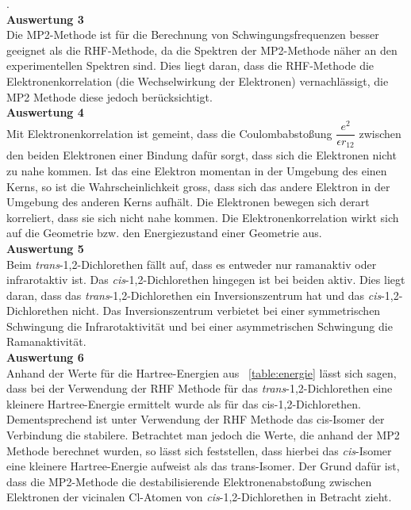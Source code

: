 \documentclass[12pt]{article}
\begin{document}
\begin{onehalfspace}
.\\
\textbf{Auswertung 3}\\
Die MP2-Methode ist für die Berechnung von Schwingungsfrequenzen besser geeignet als die RHF-Methode,
da die Spektren der MP2-Methode näher an den experimentellen Spektren sind.
Dies liegt daran, dass die RHF-Methode die Elektronenkorrelation (die Wechselwirkung der Elektronen) vernachlässigt,
die MP2 Methode diese jedoch berücksichtigt.\\
\textbf{Auswertung 4}\\
Mit Elektronenkorrelation ist gemeint, dass die Coulombabstoßung $\dfrac{e^2}{\epsilon r_{12}}$ zwischen den beiden Elektronen einer Bindung dafür sorgt, dass sich
die Elektronen nicht zu nahe kommen. Ist das eine Elektron momentan in der Umgebung des einen Kerns,
so ist die Wahrscheinlichkeit gross, dass sich das andere Elektron in der Umgebung des anderen Kerns aufhält. Die Elektronen bewegen sich derart \glqq
korreliert\grqq, dass sie sich nicht nahe kommen. Die Elektronenkorrelation wirkt sich auf die Geometrie bzw. den
Energiezustand einer Geometrie aus.\cite{coulson}  \\
\textbf{Auswertung 5}\\
Beim \textit{trans}-1,2-Dichlorethen fällt auf, dass es entweder nur ramanaktiv oder infrarotaktiv ist.
Das \textit{cis}-1,2-Dichlorethen hingegen
 ist bei beiden aktiv. Dies liegt daran, dass das \textit{trans}-1,2-Dichlorethen ein
  Inversionszentrum hat und das \textit{cis}-1,2-Dichlorethen nicht.
Das Inversionszentrum verbietet bei einer symmetrischen Schwingung die
Infrarotaktivität und bei einer asymmetrischen Schwingung die Ramanaktivität.\\
\textbf{Auswertung 6}\\

Anhand der Werte für die Hartree-Energien aus ~\ref{table:energie} lässt sich sagen, dass
bei der Verwendung der RHF Methode für das \textit{trans}-1,2-Dichlorethen eine
kleinere Hartree-Energie ermittelt wurde als für das cis-1,2-Dichlorethen.
Dementsprechend ist unter Verwendung der RHF Methode das cis-Isomer der
Verbindung die stabilere. Betrachtet man jedoch die Werte, die anhand der MP2
Methode berechnet wurden, so lässt sich feststellen, dass hierbei das \textit{cis}-Isomer
eine kleinere Hartree-Energie aufweist als das trans-Isomer. Der Grund dafür ist, dass die MP2-Methode die destabilisierende Elektronenabstoßung
 zwischen Elektronen der vicinalen Cl-Atomen von \textit{cis}-1,2-Dichlorethen in Betracht zieht.

\printbibliography

\end{onehalfspace}
\end{document}
